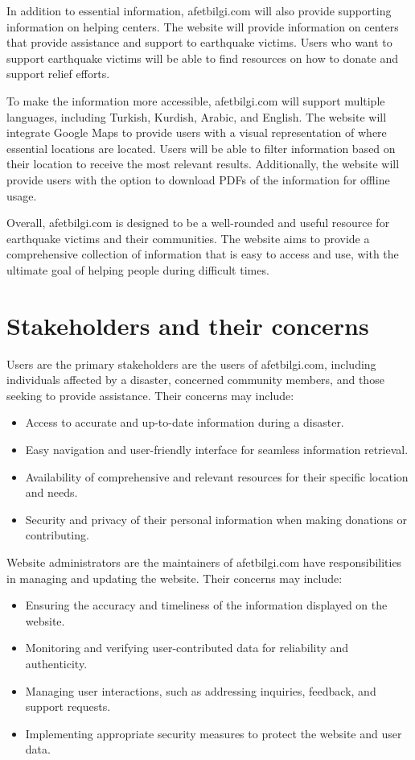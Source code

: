 \documentclass[12pt]{report}
\begin{document}
In addition to essential information, afetbilgi.com will also provide supporting information on 
helping centers. The website will provide information on centers that provide assistance and support 
to earthquake victims. Users who want to support earthquake victims will be able to find resources on
how to donate and support relief efforts.
\newline

To make the information more accessible, afetbilgi.com will support multiple languages, including 
Turkish, Kurdish, Arabic, and English. The website will integrate Google Maps to provide users with 
a visual representation of where essential locations are located. Users will be able to filter 
information based on their location to receive the most relevant results. Additionally, the website 
will provide users with the option to download PDFs of the information for offline usage.
\newline

Overall, afetbilgi.com is designed to be a well-rounded and useful resource for earthquake victims 
and their communities. The website aims to provide a comprehensive collection of information that is 
easy to access and use, with the ultimate goal of helping people during difficult times.

\section{Stakeholders and their concerns}

Users are the primary stakeholders are the users of afetbilgi.com, including individuals affected by a disaster, concerned community members, and those seeking to provide assistance. Their concerns may include:
\begin{itemize}
    \item Access to accurate and up-to-date information during a disaster.
    \item Easy navigation and user-friendly interface for seamless information retrieval.
    \item Availability of comprehensive and relevant resources for their specific location and needs.
    \item Security and privacy of their personal information when making donations or contributing.
\end{itemize}

Website administrators are the maintainers of afetbilgi.com have responsibilities in managing and updating the website. Their concerns may include:
\begin{itemize}
    \item Ensuring the accuracy and timeliness of the information displayed on the website.
    \item Monitoring and verifying user-contributed data for reliability and authenticity.
    \item Managing user interactions, such as addressing inquiries, feedback, and support requests.
    \item Implementing appropriate security measures to protect the website and user data.
\end{itemize}
\end{document}
